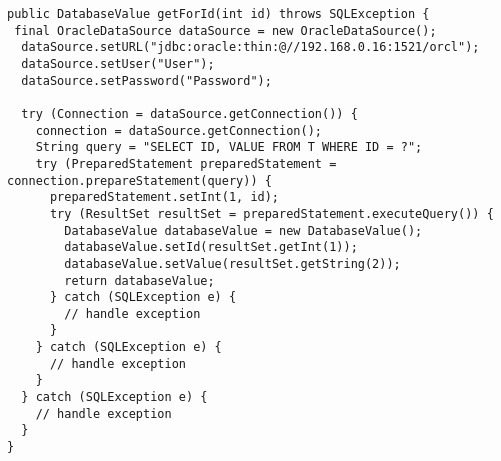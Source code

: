 
\begin{lstlisting}[caption={Example of loading data from Oracle database using try-with-resources}, label={code:jdbc-try-with-resources}]
public DatabaseValue getForId(int id) throws SQLException {
 final OracleDataSource dataSource = new OracleDataSource();
  dataSource.setURL("jdbc:oracle:thin:@//192.168.0.16:1521/orcl");
  dataSource.setUser("User");
  dataSource.setPassword("Password");

  try (Connection = dataSource.getConnection()) {
    connection = dataSource.getConnection();
    String query = "SELECT ID, VALUE FROM T WHERE ID = ?";
    try (PreparedStatement preparedStatement = connection.prepareStatement(query)) {
      preparedStatement.setInt(1, id);
      try (ResultSet resultSet = preparedStatement.executeQuery()) {
        DatabaseValue databaseValue = new DatabaseValue();
        databaseValue.setId(resultSet.getInt(1));
        databaseValue.setValue(resultSet.getString(2));
        return databaseValue;
      } catch (SQLException e) {
        // handle exception
      }
    } catch (SQLException e) {
      // handle exception
    }
  } catch (SQLException e) {
    // handle exception
  }
}
\end{lstlisting}
